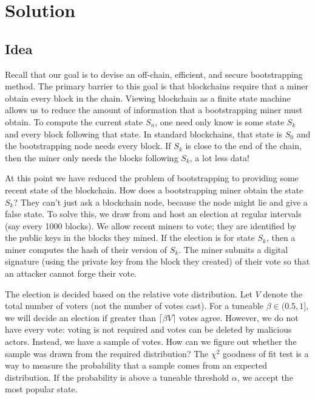 \section{Solution}
\label{sec:solution}

\subsection{Idea}

Recall that our goal is to devise an off-chain, efficient, and secure bootstrapping method.
The primary barrier to this goal is that blockchains require that a miner obtain every block in the chain.
Viewing blockchain as a finite state machine allows us to reduce the amount of information that a bootstrapping miner must obtain.
To compute the current state $S_n$, one need only know is some state $S_k$ and every block following that state.
In standard blockchains, that state is $S_0$ and the bootstrapping node needs every block.
If $S_k$ is close to the end of the chain, then the miner only needs the blocks following $S_k$, a lot less data!

At this point we have reduced the problem of bootstrapping to providing some recent state of the blockchain.
How does a bootstrapping miner obtain the state $S_k$?
They can't just ask a blockchain node, because the node might lie and give a false state.
To solve this, we draw from \cite{matzutt2020HowTSPrune} and host an election at regular intervals (say every 1000 blocks).
We allow recent miners to vote; they are identified by the public keys in the blocks they mined.
If the election is for state $S_k$, then a miner computes the hash of their version of $S_k$.
The miner submits a digital signature (using the private key from the block they created) of their vote so that an attacker cannot forge their vote.

The election is decided based on the relative vote distribution.
Let $V$ denote the total number of voters (not the number of votes cast).
For a tuneable $\beta \in (0.5,1]$, we will decide an election if greater than $\lceil \beta V \rceil$ votes agree.
However, we do not have every vote: voting is not required and votes can be deleted by malicious actors.
Instead, we have a sample of votes.
How can we figure out whether the sample was drawn from the required distribution?
The $\chi ^2$ goodness of fit test is a way to measure the probability that a sample comes from an expected distribution.
If the probability is above a tuneable threshold $\alpha$, we accept the most popular state.

